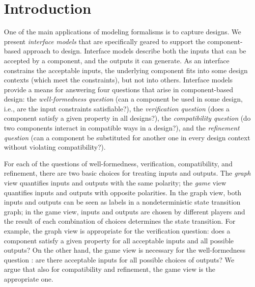 
\section{Introduction}

One of the main applications of modeling formalisms is to capture 
designs.
We present {\em interface models\/} that are
specifically geared to support the component-based approach to
design. 
Interface models describe both the inputs that can be accepted by a
component, and the outputs it can generate. 
As an interface constrains the acceptable inputs, the underlying component 
fits into some design contexts (which meet the constraints), but not into
others.  
Interface models provide a means for answering four 
questions that arise in component-based design: 
the {\em well-formedness question\/} 
(can a component be used in some design, i.e., are the input constraints 
satisfiable?),
the {\em verification question\/}
(does a component satisfy a given property in all designs?),
the {\em compatibility question\/} 
(do two components interact in compatible ways in a design?), 
and the {\em refinement question\/}
(can a component be substituted for another one in every design context 
without violating compatibility?). 

For each of the questions of well-formedness, verification, compatibility, 
and refinement, there are two basic choices for treating inputs and outputs.
The {\em graph\/} view quantifies inputs and outputs with the same polarity;
the {\em game\/} view quantifies inputs and outputs with opposite polarities.
In the graph view, both inputs and outputs can be seen as labels in a 
nondeterministic state transition graph;
in the game view, inputs and outputs are chosen by different players and 
the result of each combination of choices determines the state transition.
For example, the graph view is appropriate for the verification question:
does a component satisfy a given property for all acceptable inputs and all 
possible outputs?
On the other hand, the game view is necessary for the well-formedness
question \cite{ALW,DillThesis}:
are there acceptable inputs for all possible choices of outputs?
We argue that also for compatibility and refinement, the game view is the 
appropriate one.


